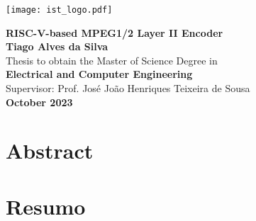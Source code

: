 \documentclass[10pt]{esda}
\title{}
\author{}
\date{}
\begin{document}
\texttt{[image: ist\_logo.pdf]}

\thispagestyle{empty}

\begin{onehalfspace}

\begin{center}
\begin{Large}
  \vspace{4cm}
  {\bf \Large {RISC-V-based MPEG1/2 Layer II Encoder}}\\
  \vspace{2.5cm}
  {\bf \Large Tiago Alves da Silva}\\
  \vspace{2cm}
  \Large {Thesis to obtain the Master of Science Degree in}\\
  \vspace{2mm}
  {\bf \Large {Electrical and Computer Engineering}}\\
  \vspace{2cm}
  \Large {Supervisor: Prof. José João Henriques Teixeira de Sousa}\\
  \vspace{1.5cm}
  \vspace{2cm}
  {\bf \Large October 2023 }
\end{Large}
\end{center}

\end{onehalfspace}


\cleardoublepage

\section*{Abstract}


\cleardoublepage
\section*{Resumo}


\cleardoublepage
\tableofcontents
\listoftables
\listoffigures
\end{document}

